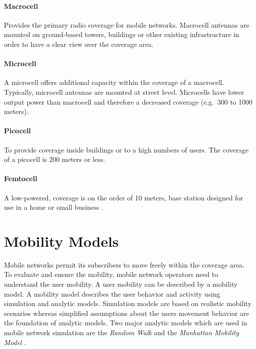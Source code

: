 \documentclass[master,english]{hgbthesis}
\begin{document}
\paragraph{Macrocell} Provides the primary radio coverage for mobile networks. Macrocell antennas are mounted on ground-based towers, buildings or other existing infrastructure in order to have a clear view over the coverage area.
\paragraph{Microcell} A microcell offers additional capacity within the coverage of a macrocell. Typically, microcell antennas are mounted at street level. Microcells have lower output power than macrocell and therefore a decreased coverage (e.g.\ 300 to 1000 meters).
\paragraph{Picocell} To provide coverage inside buildings or to a high numbers of users. The coverage of a picocell is 200 meters or less.
\paragraph{Femtocell} A low-powered, coverage is on the order of 10 meters, base station designed for use in a home or small business \cite{Zhang2011}.
\section{Mobility Models}
Mobile networks permit its subscribers to move freely within the coverage area. To evaluate and ensure the mobility, mobile network operators need to understand the user mobility. A user mobility can be described by a mobility model. A mobility model describes the user behavior and activity using simulation and analytic models. Simulation models are based on realistic mobility scenarios whereas simplified assumptions about the users movement behavior are the foundation of analytic models.
Two major analytic models which are used in mobile network simulation are the \emph{Random Walk} \cite{Akyildiz2000,Bettstetter2001,Bettstetter2002} and the \emph{Manhattan Mobility Model} \cite{Markoulidakis1997,Buruhanudeen2007}.
\end{document}
